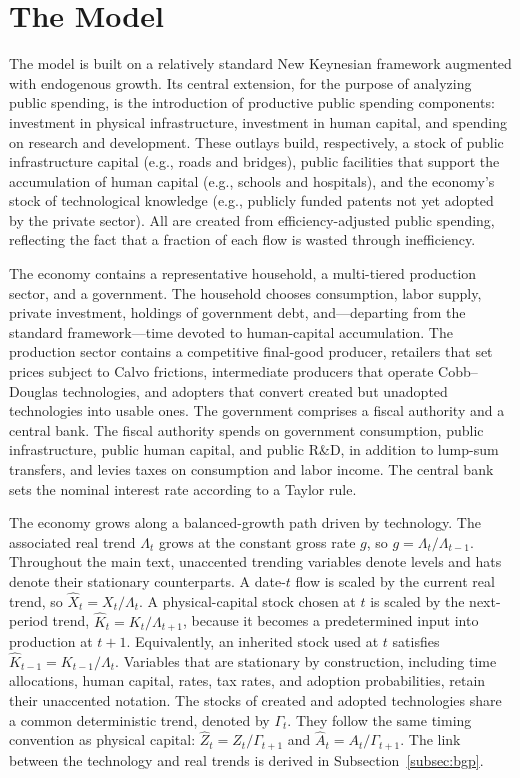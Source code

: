 \documentclass[a4paper,11pt]{article}
\begin{document}
\section{The Model} \label{sec:model}

The model is built on a relatively standard New Keynesian framework augmented with endogenous growth. 
Its central extension, for the purpose of analyzing public spending, is the introduction of productive public spending components: investment in physical infrastructure, investment in human capital, and spending on research and development. 
These outlays build, respectively, a stock of public infrastructure capital (e.g., roads and bridges), public facilities that support the accumulation of human capital (e.g., schools and hospitals), and the economy's stock of technological knowledge (e.g., publicly funded patents not yet adopted by the private sector).
All are created from efficiency-adjusted public spending, reflecting the fact that a fraction of each flow is wasted through inefficiency.


The economy contains a representative household, a multi-tiered production sector, and a government.
The household chooses consumption, labor supply, private investment, holdings of government debt, and---departing from the standard framework---time devoted to human-capital accumulation.
The production sector contains a competitive final-good producer, retailers that set prices subject to Calvo frictions, intermediate producers that operate Cobb--Douglas technologies, and adopters that convert created but unadopted technologies into usable ones.
The government comprises a fiscal authority and a central bank.
The fiscal authority spends on government consumption, public infrastructure, public human capital, and public R\&D, in addition to lump-sum transfers, and levies taxes on consumption and labor income.
The central bank sets the nominal interest rate according to a Taylor rule.

The economy grows along a balanced-growth path driven by technology.
The associated real trend $\Lambda_t$ grows at the constant gross rate $g$, so $g=\Lambda_t/\Lambda_{t-1}$.
Throughout the main text, unaccented trending variables denote levels and hats denote their stationary counterparts.
A date-$t$ flow is scaled by the current real trend, so $\hat{X}_t=X_t/\Lambda_t$.
A physical-capital stock chosen at $t$ is scaled by the next-period trend, $\hat{K}_t=K_t/\Lambda_{t+1}$, because it becomes a predetermined input into production at $t+1$.
Equivalently, an inherited stock used at $t$ satisfies $\hat{K}_{t-1}=K_{t-1}/\Lambda_t$.
Variables that are stationary by construction, including time allocations, human capital, rates, tax rates, and adoption probabilities, retain their unaccented notation.
The stocks of created and adopted technologies share a common deterministic trend, denoted by $\Gamma_t$.
They follow the same timing convention as physical capital: $\hat{Z}_t=Z_t/\Gamma_{t+1}$ and $\hat{A}_t=A_t/\Gamma_{t+1}$.
The link between the technology and real trends is derived in Subsection~\ref{subsec:bgp}.
\end{document}

